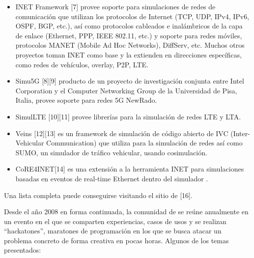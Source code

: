 \documentclass[]{article}
\begin{document}
\begin{itemize}
    \item INET Framework [7] provee soporte para simulaciones de redes de
comunicación que utilizan los protocolos de Internet (TCP, UDP, IPv4, IPv6,
OSPF, BGP, etc.), así como protocolos cableados e inalámbricos de la capa de
enlace (Ethernet, PPP, IEEE 802.11, etc.) y soporte para redes móviles,
protocolos MANET (Mobile Ad Hoc Networks), DiffServ, etc. Muchos otros
proyectos toman INET como base y la extienden en direcciones específicas, como
redes de vehículos, overlay, P2P, LTE.

    \item Simu5G [8][9] producto de un proyecto de investigación conjunta entre
Intel Corporation y el Computer Networking Group de la Universidad de Pisa,
Italia, provee soporte para redes 5G NewRado.

    \item SimulLTE [10][11] provee librerías para la simulación de redes LTE y
LTA.

    \item Veins [12][13] es un framework de simulación de código abierto de IVC
(Inter-Vehicular Communication) que utiliza \omnetpp{} para la simulación de
redes así como SUMO, un simulador de tráfico vehicular, usando cosimulación.

    \item CoRE4INET[14] es una extensión a la herramienta INET para
simulaciones basadas en eventos de real-time Ethernet dentro del simulador
\omnetpp{}.

\end{itemize}

Una lista completa puede conseguirse visitando el sitio de \omnetpp{} [16].

Desde el año 2008 en forma continuada, la comunidad de \omnetpp{} se reúne
anualmente en un evento en el que se comparten experiencias, casos de usos y se
realizan ``hackatones'', maratones de programación en los que se busca atacar
un problema concreto de forma creativa en pocas horas. Algunos de los temas
presentados:
\end{document}

